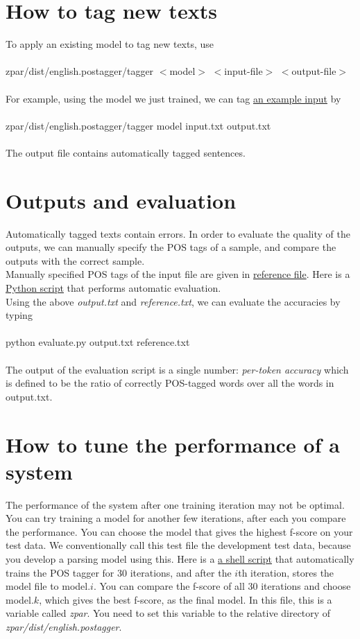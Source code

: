\documentclass[12pt]{article}
\begin{document}
\begin{CJK}{GBK}{song}
\section{How to tag new texts}
To apply an existing model to tag new texts, use
\\
\\
\hspace{3cm} zpar/dist/english.postagger/tagger $<$model$>$ $<$input-file$>$ $<$output-file$>$
\\
\\
For example, using the model we just trained, we can tag \href{eng_pos_files/input.txt}{an example input} by
\\
\\
\hspace{3cm} zpar/dist/english.postagger/tagger model input.txt output.txt
\\
\\
The output file contains automatically tagged sentences.
\section{Outputs and evaluation}
Automatically tagged texts contain errors. In order to evaluate the quality of the outputs, we can manually specify the POS tags of a sample, and compare the outputs with the correct sample.
\\
Manually specified POS tags of the input file are given in \href{eng_pos_files/reference.txt}{reference file}. Here is a \href{eng_pos_files/evaluate.py}{Python script} that performs automatic evaluation.
\\
Using the above \textit{output.txt} and \textit{reference.txt}, we can evaluate the accuracies by typing
\\
\\
\hspace{3cm} python evaluate.py output.txt reference.txt
\\
\\
The output of the evaluation script is a single number: \textit{per-token accuracy} which is defined to be the ratio of correctly POS-tagged words over all the words in output.txt.
\section{How to tune the performance of a system}
The performance of the system after one training iteration may not be optimal. You can try training a model for another few iterations, after each you compare the performance. You can choose the model that gives the highest f-score on your test data. We conventionally call this test file the development test data, because you develop a parsing model using this. Here is a \href{eng_pos_files/test.sh}{a shell script} that automatically trains the POS tagger for 30 iterations, and after the $i$th iteration, stores the model file to model.$i$. You can compare the f-score of all 30 iterations and choose model.$k$, which gives the best f-score, as the final model. In this file, this is a variable called \textit{zpar}. You need to set this variable to the relative directory of \textit{zpar/dist/english.postagger}.
\end{CJK}
\end{document}
